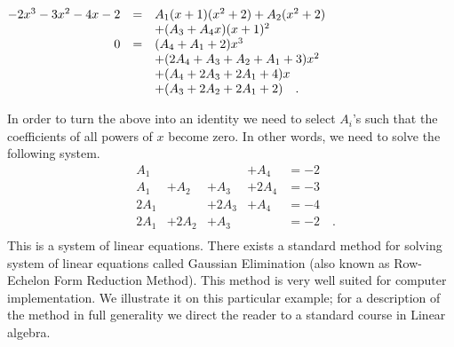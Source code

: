 {\noindent$\begin{array}{@{}rcl@{}}
-2x^{3}-3x^{2}-4x -2 &=& A_{1} (x +1)(x^{2}+2)+A_{2} (x^{2}+2)\\
&&+(A_{3} + A_{4} x)(x +1)^{2}\\
0&=&(A_{4} +A_{1} +2)x^{3}\\
&&+(2A_{4} +A_{3} +A_{2} +A_{1} +3)x^{2}\\
&&+(A_{4} +2A_{3} +2A_{1} +4)x \\
&&+(A_{3} +2A_{2} +2A_{1} +2)\quad .
\end{array}
$

\noindent In order to turn the above into an identity we need to select $A_i$'s such that the coefficients of all powers of $x$ become zero. In other words, we need to solve the following system. 
\[
\begin{array}{llllll} & A_{1} & & & +A_{4} & =-2\\ & A_{1} & +A_{2} & +A_{3} & +2A_{4} & =-3\\ & 2A_{1} & & +2A_{3} & +A_{4} & =-4\\ & 2A_{1} & +2A_{2} & +A_{3} & & =-2\quad .\\
\end{array}
\] 
This is a system of linear equations. There exists a standard method for solving system of linear equations called Gaussian Elimination (also known as Row-Echelon Form Reduction Method). This method is very well suited for computer implementation. We illustrate it on this particular example; for a description of the method in full generality we direct the reader to a standard course in Linear algebra. 

}
